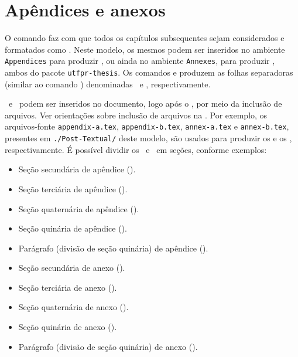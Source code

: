 \section{Apêndices e anexos}%
\label{sect:apx-anx}

O comando  faz com que todos os capítulos\label{err:chpt-6} subsequentes sejam considerados e formatados como \apxsref.
Neste modelo, os mesmos podem ser inseridos no ambiente \texttt{Appendices} para produzir \apxsref, ou ainda no ambiente \texttt{Annexes}, para produzir \anxsref, ambos do pacote \texttt{utfpr-thesis}.
Os comandos  e  produzem as folhas separadoras (similar ao comando ) denominadas \apxsref\ e \anxsref, respectivamente.

\apxsref\ e \anxsref\ podem ser inseridos no documento, logo após o \glyref, por meio da inclusão de arquivos.
Ver orientações sobre inclusão de arquivos na .
Por exemplo, os arquivos-fonte \texttt{appendix-a.tex}, \texttt{appendix-b.tex}, \texttt{annex-a.tex} e \texttt{annex-b.tex}, presentes em \texttt{./Post-Textual/} deste modelo, são usados para produzir os  e os , respectivamente.
É possível dividir os \apxsref\ e \anxsref\ em seções, conforme exemplos:

\begin{itemize}
\item Seção secundária de apêndice ().
\item Seção terciária de apêndice ().
\item Seção quaternária de apêndice ().
\item Seção quinária de apêndice ().
\item Parágrafo (divisão de seção quinária) de apêndice ().
\item Seção secundária de anexo ().
\item Seção terciária de anexo ().
\item Seção quaternária de anexo ().
\item Seção quinária de anexo ().
\item Parágrafo (divisão de seção quinária) de anexo ().
\end{itemize}
